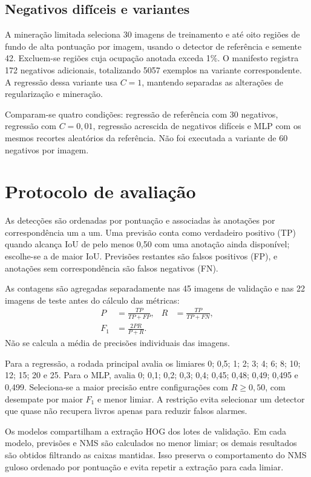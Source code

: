 \documentclass[12pt,a4paper,twocolumn]{article}
\begin{document}
\subsection{Negativos difíceis e variantes}
A mineração limitada seleciona 30 imagens de treinamento e até oito regiões de fundo de alta pontuação por imagem, usando o detector de referência e semente 42. Excluem-se regiões cuja ocupação anotada exceda 1\%. O manifesto registra 172 negativos adicionais, totalizando 5057 exemplos na variante correspondente. A regressão dessa variante usa $C=1$, mantendo separadas as alterações de regularização e mineração.

Comparam-se quatro condições: regressão de referência com 30 negativos, regressão com $C=0{,}01$, regressão acrescida de negativos difíceis e MLP com os mesmos recortes aleatórios da referência. Não foi executada a variante de 60 negativos por imagem.

\section{Protocolo de avaliação}
As detecções são ordenadas por pontuação e associadas às anotações por correspondência um a um. Uma previsão conta como verdadeiro positivo (TP) quando alcança IoU de pelo menos 0,50 com uma anotação ainda disponível; escolhe-se a de maior IoU. Previsões restantes são falsos positivos (FP), e anotações sem correspondência são falsos negativos (FN).

As contagens são agregadas separadamente nas 45 imagens de validação e nas 22 imagens de teste antes do cálculo das métricas:
\begin{align}
P&=\frac{TP}{TP+FP}, & R&=\frac{TP}{TP+FN},\\
F_1&=\frac{2PR}{P+R}.
\end{align}
Não se calcula a média de precisões individuais das imagens.

Para a regressão, a rodada principal avalia os limiares 0; 0,5; 1; 2; 3; 4; 6; 8; 10; 12; 15; 20 e 25. Para o MLP, avalia 0; 0,1; 0,2; 0,3; 0,4; 0,45; 0,48; 0,49; 0,495 e 0,499. Seleciona-se a maior precisão entre configurações com $R\geq0{,}50$, com desempate por maior $F_1$ e menor limiar. A restrição evita selecionar um detector que quase não recupera livros apenas para reduzir falsos alarmes.

Os modelos compartilham a extração HOG dos lotes de validação. Em cada modelo, previsões e NMS são calculados no menor limiar; os demais resultados são obtidos filtrando as caixas mantidas. Isso preserva o comportamento do NMS guloso ordenado por pontuação e evita repetir a extração para cada limiar.
\end{document}
